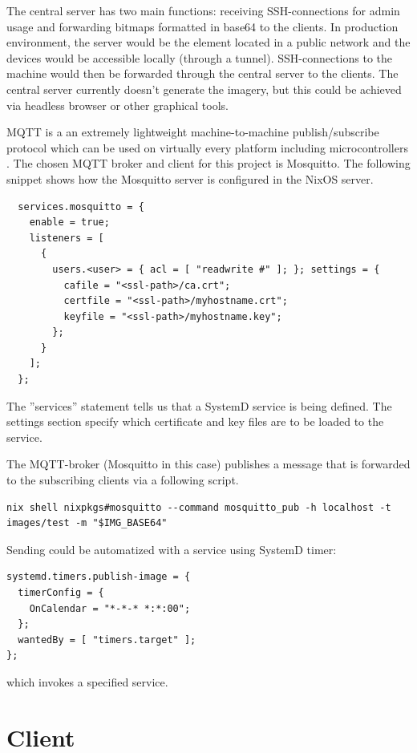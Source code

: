 The central server has two main functions: receiving SSH-connections
for admin usage and forwarding bitmaps formatted in base64 to the
clients. In production environment, the server would be the element
located in a public network and the devices would be accessible
locally (through a tunnel). SSH-connections to the machine would then
be forwarded through the central server to the clients. The central
server currently doesn't generate the imagery, but this could be
achieved via headless browser or other graphical tools.

MQTT is a an extremely lightweight machine-to-machine publish/subscribe
protocol which can be used on virtually every platform including
microcontrollers \cite{oasisopenMQTTVersion}. The chosen MQTT broker
and client for this project is Mosquitto. The following snippet shows
how the Mosquitto server is configured in the NixOS server.

\begin{lstlisting}
  services.mosquitto = {
    enable = true;
    listeners = [
      {
        users.<user> = { acl = [ "readwrite #" ]; }; settings = {
          cafile = "<ssl-path>/ca.crt";
          certfile = "<ssl-path>/myhostname.crt";
          keyfile = "<ssl-path>/myhostname.key";
        };
      }
    ];
  };
\end{lstlisting}

The ''services'' statement tells us that a SystemD service is being
defined. The settings section specify which certificate and key files
are to be loaded to the service.

The MQTT-broker (Mosquitto in this case) publishes a message that is
forwarded to the subscribing clients via a following script.

\begin{lstlisting}
nix shell nixpkgs#mosquitto --command mosquitto_pub -h localhost -t
images/test -m "$IMG_BASE64"
\end{lstlisting}

Sending could be automatized with a service using SystemD timer:
\begin{lstlisting}
systemd.timers.publish-image = {
  timerConfig = {
    OnCalendar = "*-*-* *:*:00";
  };
  wantedBy = [ "timers.target" ];
};
\end{lstlisting}

which invokes a specified service.

\section{Client}

